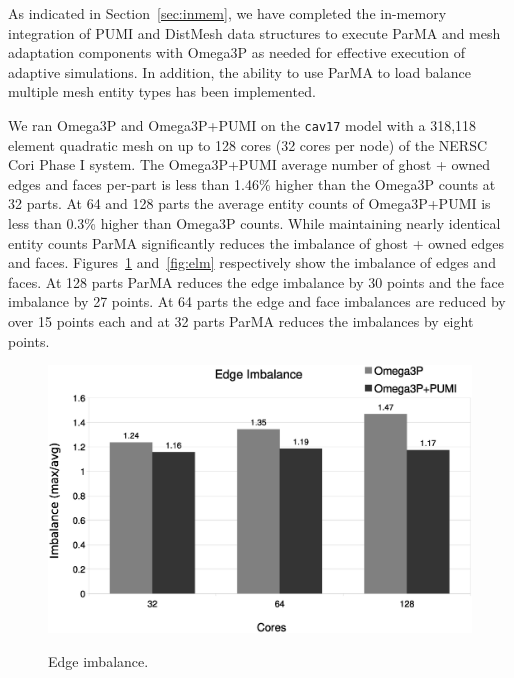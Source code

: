 \documentclass[a4paper]{article}
\begin{document}
As indicated in Section~\ref{sec:inmem}, we have completed the in-memory
integration of PUMI and DistMesh data structures to execute ParMA and mesh
adaptation components with Omega3P as needed for effective execution of adaptive
simulations.
In addition, the ability to use ParMA to load balance multiple mesh entity
types has been implemented.

We ran Omega3P and Omega3P+PUMI on the \texttt{cav17} model with a 318,118
element quadratic mesh on up to 128 cores (32 cores per node) of the NERSC Cori
Phase I system.
The Omega3P+PUMI average number of ghost + owned edges and faces per-part
is less than 1.46\% higher than the Omega3P counts at 32 parts.
At 64 and 128 parts the average entity counts of Omega3P+PUMI is less than 0.3\%
higher than Omega3P counts.
While maintaining nearly identical entity counts ParMA significantly reduces the
imbalance of ghost + owned edges and faces. 
Figures~\ref{fig:vtx} and~\ref{fig:elm} respectively show the imbalance of
edges and faces.
At 128 parts ParMA reduces the edge imbalance by 30 points and the face
imbalance by 27 points.
At 64 parts the edge and face imbalances are reduced by over 15 points each and
at 32 parts ParMA reduces the imbalances by eight points.

\begin{figure}[ht]
\centering
  \includegraphics[width=\textwidth]{edge-imb.eps} \\
  \caption{\label{fig:vtx} Edge imbalance.}
\end{figure}
\end{document}
